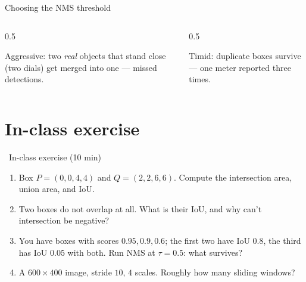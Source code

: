 \documentclass[10pt,aspectratio=169]{beamer}
\begin{document}
\begin{frame}{Choosing the NMS threshold}
  \begin{columns}[T]
    \begin{column}{0.5\textwidth}
      \begin{badbox}
        Aggressive: two \emph{real} objects that stand close (two dials) get merged into one --- missed detections.
      \end{badbox}
    \end{column}
    \begin{column}{0.5\textwidth}
      \begin{badbox}
        Timid: duplicate boxes survive --- one meter reported three times.
      \end{badbox}
    \end{column}
  \end{columns}
  \vspace{2pt}
\end{frame}

\section{In-class exercise}

\begin{frame}{\faPen~In-class exercise (10 min)}
  \begin{infobox}
  \end{infobox}
  \begin{enumerate}
    \item Box $P=(0,0,4,4)$ and $Q=(2,2,6,6)$. Compute the intersection area, union area, and IoU.
    \item Two boxes do not overlap at all. What is their IoU, and why can't intersection be negative?
    \item You have boxes with scores $0.95, 0.9, 0.6$; the first two have IoU $0.8$, the third has IoU $0.05$ with both. Run NMS at $\tau=0.5$: what survives?
    \item A $600\times400$ image, stride $10$, $4$ scales. Roughly how many sliding windows?
  \end{enumerate}
\end{frame}
\end{document}

